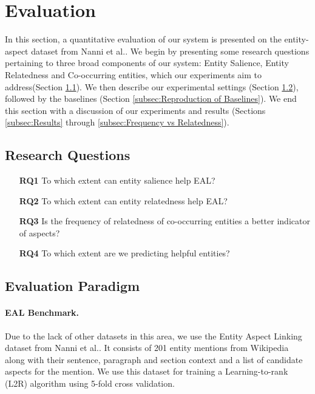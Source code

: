 
\section{Evaluation}
\label{sec:Evaluation}
In this section, a quantitative evaluation of our system is presented on the entity-aspect dataset from Nanni et al.\cite{nanni2018entity}. We begin by presenting some research questions pertaining to three broad components of our system: Entity Salience, Entity Relatedness and Co-occurring entities, which our experiments aim to address(Section \ref{subsec:Research Questions}). We then describe our experimental settings (Section \ref{subsec:Evaluation Paradigm}), followed by the baselines (Section \ref{subsec:Reproduction of Baselines}). We end this section with a discussion of our experiments and results (Sections \ref{subsec:Results} through \ref{subsec:Frequency vs Relatedness}).

\subsection{Research Questions}
\label{subsec:Research Questions}

\begin{itemize}
\item[\textbf{RQ1}] To which extent can  entity salience help EAL?
\item[\textbf{RQ2}] To which extent can entity relatedness help EAL?
\item[\textbf{RQ3}] Is the frequency of relatedness of co-occurring entities a better indicator of aspects? 
\item[\textbf{RQ4}] To which extent are we predicting helpful entities?
\end{itemize}

\subsection{Evaluation Paradigm}
\label{subsec:Evaluation Paradigm}

\paragraph{\textbf{EAL Benchmark.}} Due to the lack of other datasets in this area, we use the Entity Aspect Linking dataset from Nanni et al.\cite{nanni2018entity}. It consists of 201 entity mentions from Wikipedia along with their sentence, paragraph and section context and a list of candidate aspects for the mention.   We use this dataset for training a Learning-to-rank (L2R) algorithm using 5-fold cross validation. 

